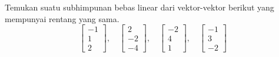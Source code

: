 \begin{exercise}
Temukan suatu subhimpunan bebas linear dari vektor-vektor berikut yang mempunyai
rentang yang sama.
\begin{equation*}
\begin{bmatrix}
-1 \\ 1 \\ 2
\end{bmatrix}
, \quad
\begin{bmatrix}
2 \\ -2 \\ -4
\end{bmatrix}
, \quad
\begin{bmatrix}
-2 \\ 4 \\ 1
\end{bmatrix}
, \quad
\begin{bmatrix}
-1 \\ 3 \\ -2
\end{bmatrix}
\end{equation*}
\end{exercise}

\setcounter{exercise}{100}

